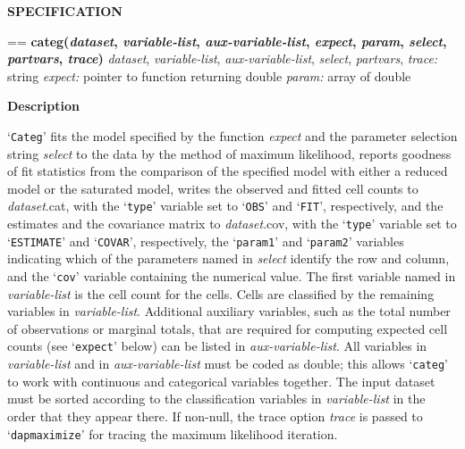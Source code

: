 \documentclass{book}
\makeatletter
\newcommand\Texinfocommandstyletextvar[1]{{\normalfont{}\textsl{#1}}}%
\newenvironment{Texinfopreformatted}{%
  \par\GNUTobeylines\obeyspaces\frenchspacing\parskip=\z@\parindent=\z@}{}
{\catcode`\^^M=13 \gdef\GNUTobeylines{\catcode`\^^M=13 \def^^M{\null\par}}}
\newenvironment{Texinfoindented}{\begin{list}{}{}\item\relax}{\end{list}}
\renewcommand{\_}{\Texinfounderscore\discretionary{}{}{}}
\makeatother
\begin{document}
\noindent{}\textbf{SPECIFICATION}
\begin{Texinfoindented}
\begin{Texinfopreformatted}%
\textbf{categ(\Texinfocommandstyletextvar{dataset}, \Texinfocommandstyletextvar{variable-list}, \Texinfocommandstyletextvar{aux-variable-list}, \Texinfocommandstyletextvar{expect}, \Texinfocommandstyletextvar{param}, \Texinfocommandstyletextvar{select}, \Texinfocommandstyletextvar{partvars}, \Texinfocommandstyletextvar{trace})}
\Texinfocommandstyletextvar{dataset}, \Texinfocommandstyletextvar{variable-list}, \Texinfocommandstyletextvar{aux-variable-list}, \Texinfocommandstyletextvar{select}, \Texinfocommandstyletextvar{partvars}, \Texinfocommandstyletextvar{trace:} string
\Texinfocommandstyletextvar{expect:} pointer to function returning double
\Texinfocommandstyletextvar{param:} array of double
\end{Texinfopreformatted}
\end{Texinfoindented}
%
%
%
%
%

\noindent{}\textbf{Description}

`\texttt{Categ}' fits the model specified by the function \Texinfocommandstyletextvar{expect}
and the parameter selection string \Texinfocommandstyletextvar{select} to the data by
the method of maximum likelihood, reports goodness of fit statistics from the
comparison of the specified model with either a reduced
model or the saturated model, writes
the observed and fitted cell counts to \Texinfocommandstyletextvar{dataset}.cat,
with the `\texttt{\_type\_}' variable set to `\texttt{OBS}' and `\texttt{FIT}', respectively,
and the estimates and the covariance matrix to \Texinfocommandstyletextvar{dataset}.cov,
with the `\texttt{\_type\_}' variable set to `\texttt{ESTIMATE}' and
`\texttt{COVAR}', respectively, the `\texttt{\_param1\_}'
and `\texttt{\_param2\_}' variables indicating which of the parameters named in
\Texinfocommandstyletextvar{select} identify the row and column, and the `\texttt{\_cov\_}' variable
containing the numerical value.
The first variable named in \Texinfocommandstyletextvar{variable-list} is the cell count for the cells.
Cells are classified by the remaining variables in \Texinfocommandstyletextvar{variable-list}.
Additional auxiliary variables, such as the total number
of observations or marginal totals, that are required for computing expected
cell counts (see `\texttt{expect}' below) can be listed in \Texinfocommandstyletextvar{aux-variable-list}.
All variables in \Texinfocommandstyletextvar{variable-list} and in \Texinfocommandstyletextvar{aux-variable-list}
must be coded as double; this allows `\texttt{categ}'
to work with continuous and categorical variables together.
The input dataset must be sorted according to the classification variables in
\Texinfocommandstyletextvar{variable-list} in the order that they appear there.
If non-null,
the trace option \Texinfocommandstyletextvar{trace} is passed to `\texttt{dap\_maximize}' for tracing the
maximum likelihood iteration.
\end{document}
